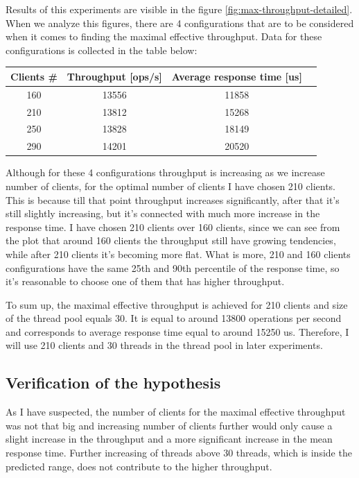\documentclass[11pt]{article}
\begin{document}
Results of this experiments are visible in the figure \ref{fig:max-throughput-detailed}. When we analyze this figures, there are 4 configurations that are to be considered when it comes to finding the maximal effective throughput. Data for these configurations is collected in the table below:

\medskip

\begin{tabular}{|c|c|c|c|}
\hline \bf{Clients \#} & Throughput [ops/s] &\bf{Average response time [us]}  \\
\hline 160 & 13556 & 11858 \\
\hline 210 & 13812 & 15268 \\
\hline 250 & 13828 & 18149 \\
\hline 290 & 14201 & 20520 \\
\hline
\end{tabular}
\medskip

Although for these 4 configurations throughput is increasing as we increase number of clients, for the optimal number of clients I have chosen 210 clients. This is because till that point throughput increases significantly, after that it's still slightly increasing, but it's connected with much more increase in the response time. I have chosen 210 clients over 160 clients, since we can see from the plot that around 160 clients the throughput still have growing tendencies, while after 210 clients it's becoming more flat. What is more, 210 and 160 clients configurations have the same 25th and 90th percentile of the response time, so it's reasonable to choose one of them that has higher throughput.

To sum up, the maximal effective throughput is achieved for 210 clients and size of the thread pool equals 30. It is equal to around 13800 operations per second and corresponds to average response time equal to around 15250 us. Therefore, I will use 210 clients and 30 threads in the thread pool in later experiments.  

\subsection{Verification of the hypothesis}

As I have suspected, the number of clients for the maximal effective throughput was not that big and increasing number of clients further would only cause a slight increase in the throughput and a more significant increase in the mean response time. Further increasing of threads above 30 threads, which is inside the predicted range, does not contribute to the higher throughput.
\end{document}
